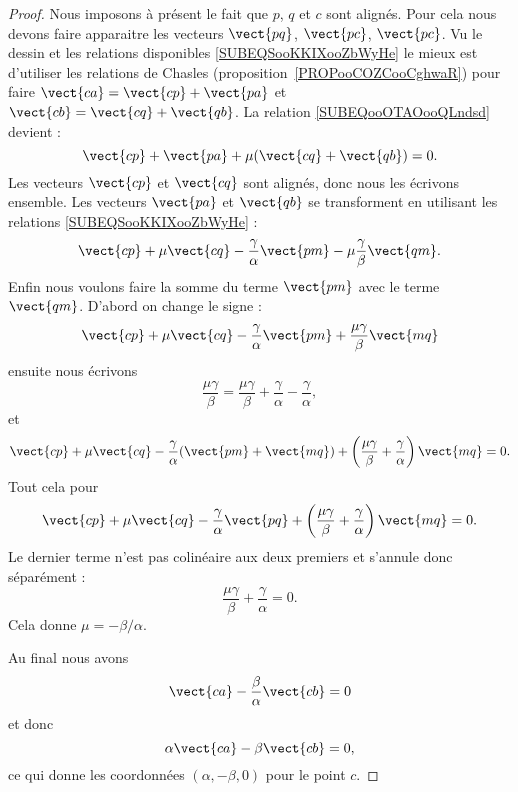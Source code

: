 \begin{proof}
	Nous imposons à présent le fait que \( p\), \( q\) et \( c \) sont alignés. Pour cela nous devons faire apparaitre les vecteurs \( \vect{ pq }\), \( \vect{ pc }\), \( \vect{ pc }\). Vu le dessin et les relations disponibles \eqref{SUBEQSooKKIXooZbWyHe} le mieux est d'utiliser les relations de Chasles  (proposition~\ref{PROPooCOZCooCghwaR}) pour faire \( \vect{ ca }=\vect{ cp }+\vect{ pa }\) et \( \vect{ cb }=\vect{ cq }+\vect{ qb }\).  La relation \eqref{SUBEQooOTAOooQLndsd} devient :
	\begin{equation}
		\vect{ cp }+\vect{ pa }+\mu(\vect{ cq }+\vect{ qb })=0.
	\end{equation}
	Les vecteurs \( \vect{ cp }\) et \( \vect{ cq }\) sont alignés, donc nous les écrivons ensemble. Les vecteurs \( \vect{ pa }\) et \( \vect{ qb }\) se transforment en utilisant les relations \eqref{SUBEQSooKKIXooZbWyHe} :
	\begin{equation}
		\vect{ cp }+\mu\vect{ cq }-\frac{ \gamma }{ \alpha }\vect{ pm }-\mu\frac{ \gamma }{ \beta }\vect{ qm }.
	\end{equation}
	Enfin nous voulons faire la somme du terme \( \vect{ pm }\) avec le terme \( \vect{ qm }\). D'abord on change le signe :
	\begin{equation}
		\vect{ cp }+\mu\vect{ cq }-\frac{ \gamma }{ \alpha }\vect{ pm }+\frac{ \mu\gamma }{ \beta }\vect{ mq }
	\end{equation}
	ensuite nous écrivons
	\begin{equation}
		\frac{ \mu\gamma }{ \beta }=\frac{ \mu\gamma }{ \beta }+\frac{ \gamma }{ \alpha }-\frac{ \gamma }{ \alpha },
	\end{equation}
	et
	\begin{equation}
		\vect{ cp }+\mu\vect{ cq }-\frac{ \gamma }{ \alpha }(\vect{ pm }+\vect{ mq })+\left( \frac{ \mu\gamma }{ \beta }+\frac{ \gamma }{ \alpha } \right)\vect{ mq }=0.
	\end{equation}
	Tout cela pour
	\begin{equation}
		\vect{ cp }+\mu\vect{ cq }-\frac{ \gamma }{ \alpha }\vect{ pq }+\left( \frac{ \mu\gamma }{ \beta }+\frac{ \gamma }{ \alpha } \right)\vect{ mq }=0.
	\end{equation}
	Le dernier terme n'est pas colinéaire aux deux premiers et s'annule donc séparément :
	\begin{equation}
		\frac{ \mu\gamma }{ \beta }+\frac{ \gamma }{ \alpha }=0.
	\end{equation}
	Cela donne \( \mu=-\beta/\alpha\).

	Au final nous avons
	\begin{equation}
		\vect{ ca }-\frac{ \beta }{ \alpha }\vect{ cb }=0
	\end{equation}
	et donc
	\begin{equation}        \label{EQooWKBWooEWhDiM}
		\alpha\vect{ ca }-\beta\vect{ cb }=0,
	\end{equation}
	ce qui donne les coordonnées \( (\alpha,-\beta,0)\) pour le point \( c\).


\end{proof}
